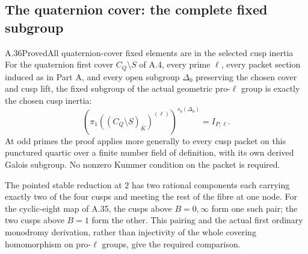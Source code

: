\subsection{The quaternion cover: the complete fixed subgroup}

\begin{statement}{A.36}{Proved}{All quaternion-cover fixed elements are in the selected cusp inertia}
For the quaternion first cover \(C_Q\setminus S\) of A.4,
every prime \(\ell\), every packet section induced as in
Part A, and every open subgroup \(\Delta_0\) preserving the
chosen cover and cusp lift, the fixed subgroup of the actual
geometric pro-\(\ell\) group is exactly the chosen cusp inertia:
\[
       \left(\pi_1((C_Q\setminus S)_{\bar K})^{(\ell)}
                          \right)^{s_b(\Delta_0)}
                              =I_{P,\ell}.              \tag{A.36.1}
\]
At odd primes the proof applies more generally to every
cusp packet on this punctured quartic over a finite number
field of definition, with its own derived Galois subgroup.
No nonzero Kummer condition on the packet is required.

The pointed stable reduction at \(2\) has two rational
components each carrying exactly two of the four cusps
and meeting the rest of the fibre at one node. For the
cyclic-eight map of A.35, the cusps above \(B=0,\infty\)
form one such pair; the two cusps above \(B=1\) form the
other. This pairing and the actual first ordinary
monodromy derivation, rather than injectivity of the
whole covering homomorphism on pro-\(\ell\) groups,
give the required comparison.
\end{statement}


